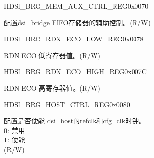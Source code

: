 \begin{register}{H}{DSI\_BRG\_MEM\_AUX\_CTRL\_REG}{0x0070}\label{regdesc:DSIBRGMEMAUXCTRLREG}
%
%
\regnewline%
\begin{regdesc}\begin{reglist}
\label{fielddesc:DSIBRGDSIMEMAUXCTRL}\item [DSI\_BRG\_DSI\_MEM\_AUX\_CTRL] 配置dsi\_bridge FIFO存储器的辅助控制。(R/W)
\end{reglist}\end{regdesc}
\end{register}


\begin{register}{H}{DSI\_BRG\_RDN\_ECO\_LOW\_REG}{0x0078}\label{regdesc:DSIBRGRDNECOLOWREG}
%
\regnewline%
\begin{regdesc}\begin{reglist}
\label{fielddesc:DSIBRGRDNECOLOW}\item [DSI\_BRG\_RDN\_ECO\_LOW] RDN ECO 低寄存器值。(R/W)
\end{reglist}\end{regdesc}
\end{register}


\begin{register}{H}{DSI\_BRG\_RDN\_ECO\_HIGH\_REG}{0x007C}\label{regdesc:DSIBRGRDNECOHIGHREG}
%
\regnewline%
\begin{regdesc}\begin{reglist}
\label{fielddesc:DSIBRGRDNECOHIGH}\item [DSI\_BRG\_RDN\_ECO\_HIGH] RDN ECO 高寄存器值。(R/W)
\end{reglist}\end{regdesc}
\end{register}


\begin{register}{H}{DSI\_BRG\_HOST\_CTRL\_REG}{0x0080}\label{regdesc:DSIBRGHOSTCTRLREG}
%
%
\regnewline%
\begin{regdesc}\begin{reglist}
\label{fielddesc:DSIBRGDSICFGREFCLKEN}\item [DSI\_BRG\_DSI\_CFG\_REF\_CLK\_EN] 配置是否使能 dsi\_host的refclk和cfg\_clk时钟。\\0: 禁用\\1: 使能 \\(R/W)
\end{reglist}\end{regdesc}
\end{register}


